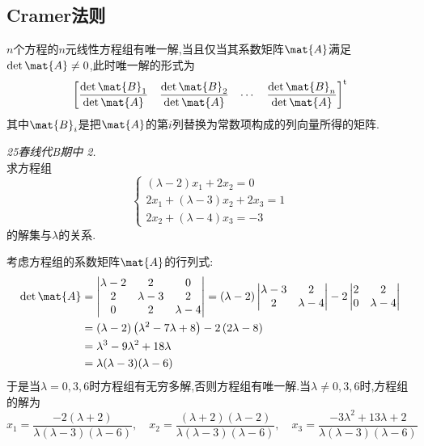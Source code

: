 \documentclass{ctexart}
\begin{document}
\subsection{Cramer法则}
\begin{theorem}[Cramer法则]
    $n$个方程的$n$元线性方程组有唯一解,当且仅当其系数矩阵$\mat{A}$满足$\det\mat{A}\neq0$,此时唯一解的形式为
    \[\begin{bmatrix}
        \dfrac{\det\mat{B}_1}{\det\mat{A}}&\dfrac{\det\mat{B}_2}{\det\mat{A}}&\cdots&\dfrac{\det\mat{B}_n}{\det\mat{A}}
    \end{bmatrix}^{\text{t}}\]
    其中$\mat{B}_i$是把$\mat{A}$的第$i$列替换为常数项构成的列向量所得的矩阵.
\end{theorem}
\begin{problem}\textit{25春线代B期中 2.}\\
    求方程组
    \[\left\{\begin{array}{l}
        (\lambda-2)x_1+2x_2=0\\
        2x_1+(\lambda-3)x_2+2x_3=1\\
        2x_2+(\lambda-4)x_3=-3
    \end{array}\right.\]
    的解集与$\lambda$的关系.
\end{problem}
\begin{solution}
    考虑方程组的系数矩阵$\mat{A}$的行列式:
    \[\begin{aligned}
        \det\mat{A}
        &=\begin{vmatrix}
            \lambda-2&2&0\\
            2&\lambda-3&2\\
            0&2&\lambda-4
        \end{vmatrix}=(\lambda-2)\begin{vmatrix}
            \lambda-3&2\\2&\lambda-4
        \end{vmatrix}-2\begin{vmatrix}
            2&2\\0&\lambda-4
        \end{vmatrix}\\
        &= \left(\lambda-2\right)\left(\lambda^2-7\lambda+8\right)-2\left(2\lambda-8\right) \\
        &= \lambda^3-9\lambda^2+18\lambda \\
        &= \lambda(\lambda-3)(\lambda-6)
    \end{aligned}\]
    于是当$\lambda=0,3,6$时方程组有无穷多解,否则方程组有唯一解.当$\lambda\neq0,3,6$时,方程组的解为
    \[x_1=\dfrac{-2(\lambda+2)}{\lambda(\lambda-3)(\lambda-6)},\quad x_2=\dfrac{(\lambda+2)(\lambda-2)}{\lambda(\lambda-3)(\lambda-6)},\quad x_3=\dfrac{-3\lambda^2+13\lambda+2}{\lambda(\lambda-3)(\lambda-6)}\]
\end{solution}
\end{document}
